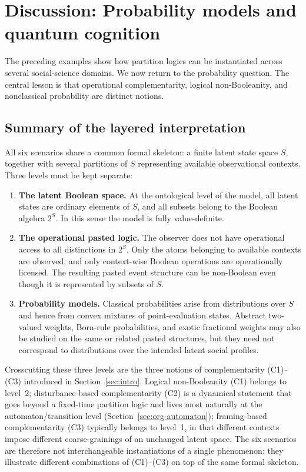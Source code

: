 \documentclass[aps,pra,twocolumn,superscriptaddress,floatfix,longbibliography]{revtex4-2}
\begin{document}
\section{Discussion: Probability models and quantum cognition}
\label{sec:discussion}

The preceding examples show how partition logics can be instantiated
across several social-science domains. We now return to the
probability question. The central lesson is that operational
complementarity, logical non-Booleanity, and nonclassical
probability are distinct notions.

\subsection{Summary of the layered interpretation}

All six scenarios share a common formal skeleton: a finite latent
state space $S$, together with several partitions of $S$ representing
available observational contexts. Three levels must be kept separate:

\begin{enumerate}
\item \textbf{The latent Boolean space.}
At the ontological level of the model, all latent states are ordinary
elements of $S$, and all subsets belong to the Boolean algebra
$2^S$. In this sense the model is fully value-definite.

\item \textbf{The operational pasted logic.}
The observer does not have operational access to all distinctions in
$2^S$. Only the atoms belonging to available contexts are observed,
and only context-wise Boolean operations are operationally licensed.
The resulting pasted event structure can be non-Boolean even though
it is represented by subsets of $S$.

\item \textbf{Probability models.}
Classical probabilities arise from distributions over $S$ and hence
from convex mixtures of point-evaluation states. Abstract two-valued
weights, Born-rule probabilities, and exotic fractional weights may
also be studied on the same or related pasted structures, but they
need not correspond to distributions over the intended latent social
profiles.
\end{enumerate}

Crosscutting these three levels are the three notions of
complementarity (C1)--(C3) introduced in Section~\ref{sec:intro}.
Logical non-Booleanity (C1) belongs to level~2; disturbance-based
complementarity (C2) is a dynamical statement that goes beyond a
fixed-time partition logic and lives most naturally at the
automaton/transition level (Section~\ref{sec:org-automaton});
framing-based complementarity (C3) typically belongs to level~1, in
that different contexts impose different coarse-grainings of an
unchanged latent space. The six scenarios are therefore not
interchangeable instantiations of a single phenomenon: they
illustrate different combinations of (C1)--(C3) on top of the same
formal skeleton.
\end{document}
